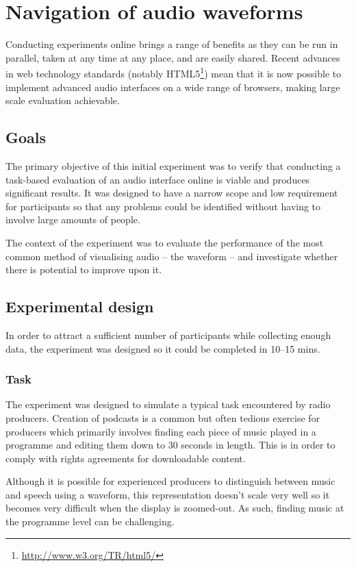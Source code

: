\chapter{Navigation of audio waveforms}\label{sec:study}
Conducting experiments online brings a range of benefits as they can be run in
parallel, taken at any time at any place, and are easily shared. Recent
advances in web technology standards (notably
HTML5\footnote{\url{http://www.w3.org/TR/html5/}}) mean that it is now
possible to implement advanced audio interfaces on a wide range of browsers,
making large scale evaluation achievable.

\section{Goals}
The primary objective of this initial experiment was to verify that conducting
a task-based evaluation of an audio interface online is viable and produces
significant results. It was designed to have a narrow scope and low requirement
for participants so that any problems could be identified without having to
involve large amounts of people.

The context of the experiment was to evaluate the performance of the most
common method of visualising audio -- the waveform -- and investigate whether
there is potential to improve upon it.

\section{Experimental design}
In order to attract a sufficient number of participants while collecting enough
data, the experiment was designed so it could be completed in 10--15 mins.

\subsection{Task}\label{sec:studytask}
The experiment was designed to simulate a typical task encountered by radio
producers. Creation of podcasts is a common but often tedious exercise for
producers which primarily involves finding each piece of music played in a
programme and editing them down to 30 seconds in length. This is in order to
comply with rights agreements for downloadable content.

Although it is possible for experienced producers to distinguish between music
and speech using a waveform, this representation doesn't scale very well so it
becomes very difficult when the display is zoomed-out. As such, finding music
at the programme level can be challenging.

